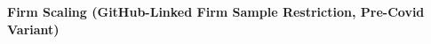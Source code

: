 \documentclass{article}
\begin{document}
\thispagestyle{empty}

\begin{table}[h!]
\caption{\textbf{Firm Scaling (GitHub-Linked Firm Sample Restriction, Pre-Covid Variant)}}

\end{table}
\end{document}

